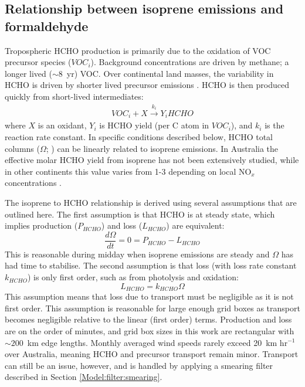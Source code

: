     
  \subsection{Relationship between isoprene emissions and formaldehyde}
    \label{BioIsop:method:slope}
    
    
    Tropospheric HCHO production is primarily due to the oxidation of VOC precursor species ($VOC_i$).
    Background concentrations are driven by methane; a longer lived ($\sim 8$~yr) VOC.
    Over continental land masses, the variability in HCHO is driven by shorter lived precursor emissions \parencite{Chance2000,Palmer2003}.
    HCHO is then produced quickly from short-lived intermediates:
    \begin{eqnarray*}
      VOC_i + X \overset{k_i}{\rightarrow} Y_i HCHO
    \end{eqnarray*}
    where $X$ is an oxidant, $Y_i$ is HCHO yield (per C atom in $VOC_i$), and $k_i$ is the reaction rate constant.
    In specific conditions described below, HCHO total columns ($\Omega$; \moleccm) can be linearly related to isoprene emissions.
    In Australia the effective molar HCHO yield from isoprene has not been extensively studied, while in other continents this value varies from 1-3 depending on local NO$_x$ concentrations \parencite[e.g.,][]{Palmer2006, Millet2006, Bauwens2016, Surl2018}.
    
    The isoprene to HCHO relationship is derived using several assumptions that are outlined here.
    The first assumption is that HCHO is at steady state, which implies production ($P_{HCHO}$) and loss ($L_{HCHO}$) are equivalent:
    \begin{equation}
      \label{BioIsop:method:slope:eqn_steady_state]}
      \frac{d \Omega }{dt} = 0 = P_{HCHO} - L_{HCHO}
    \end{equation}
    This is reasonable during midday when isoprene emissions are steady and $\Omega$ has had time to stabilise.
    The second assumption is that loss (with loss rate constant $k_{HCHO}$) is only first order, such as from photolysis and oxidation:
    \begin{equation}
      \label{BioIsop:method:slope:eqn_loss}
      L_{HCHO}  = k_{HCHO} \Omega %
    \end{equation}
    This assumption means that loss due to transport must be negligible as it is not first order.
    This assumption is reasonable for large enough grid boxes as transport becomes negligible relative to the linear (first order) terms.
    Production and loss are on the order of minutes, and grid box sizes in this work are rectangular with $\sim 200$~km edge lengths.
    Monthly averaged wind speeds rarely exceed 20~km hr$^{-1}$ over Australia, meaning HCHO and precursor transport remain minor.
    Transport can still be an issue, however, and is handled by applying a smearing filter described in Section \ref{Model:filter:smearing}.
    
